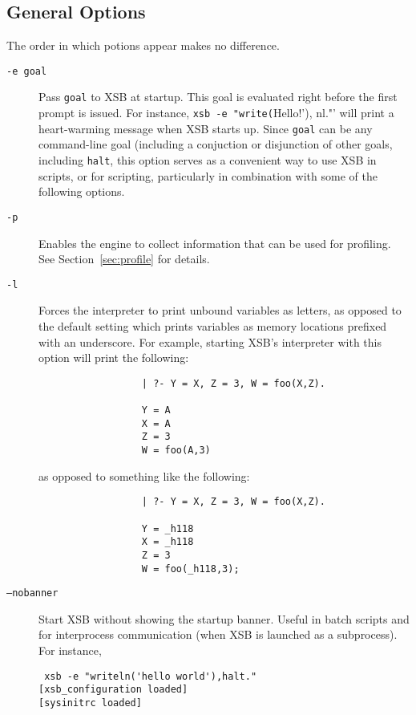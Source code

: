 

\subsection{General Options}
The order in which potions appear makes no difference.
\begin{description}
\item[{\tt -e goal}] Pass {\tt goal} to XSB at startup. This goal is
  evaluated right before the first prompt is issued. For instance,
  \verb'xsb -e "write('Hello!'), nl."'  will print a heart-warming
  message when XSB starts up.  Since {\tt goal} can be any
  command-line goal (including a conjuction or disjunction of other
  goals, including {\tt halt}, this option serves as a convenient way
  to use XSB in scripts, or for scripting, particularly in combination
  with some of the following options.
%
\item[{\tt -p}] Enables the engine to collect information that can be
  used for profiling.  See Section~\ref{sec:profile} for details.
%
\item[{\tt -l}] Forces the interpreter to print unbound variables as
	letters, as opposed to the default setting which prints
	variables as memory locations prefixed with an underscore.
	For example, starting XSB's interpreter with this option will
	print the following:
        \begin{verbatim}
                  | ?- Y = X, Z = 3, W = foo(X,Z).

                  Y = A
                  X = A
                  Z = 3
                  W = foo(A,3)
	\end{verbatim}
	as opposed to something like the following:
	\begin{verbatim}
                  | ?- Y = X, Z = 3, W = foo(X,Z).

                  Y = _h118
                  X = _h118
                  Z = 3
                  W = foo(_h118,3);
	\end{verbatim}
  \item[{\tt --nobanner}] Start XSB without showing the startup banner.
    Useful in batch scripts and for interprocess communication (when XSB is
    launched as a subprocess).  For instance, 
\begin{verbatim}
 xsb -e "writeln('hello world'),halt."
[xsb_configuration loaded]
[sysinitrc loaded]


\end{verbatim}
\end{description}

